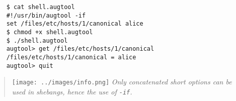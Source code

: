    

\begin{verbatim}
    $ cat shell.augtool
    #!/usr/bin/augtool -if
    set /files/etc/hosts/1/canonical alice
    $ chmod +x shell.augtool
    $ ./shell.augtool
    augtool> get /files/etc/hosts/1/canonical
    /files/etc/hosts/1/canonical = alice
    augtool> quit
\end{verbatim}

\begin{quote}
\texttt{[image: ../images/info.png]} \emph{Only concatenated short options can be used in shebangs, hence the use of \texttt{-if}.}
\end{quote}
